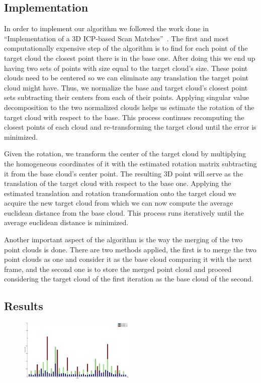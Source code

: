 \subsection{Implementation}
In order to implement our algorithm we followed the work done in ``Implementation of a 3D ICP-based Scan Matches''~\cite{icpImp}. The first and most computationally expensive step of the algorithm is to find for each point of the target cloud the closest point there is in the base one. After doing this we end up having two sets of points with size equal to the target cloud's size. These point clouds need to be centered so we can eliminate any translation the target point cloud might have. Thus, we normalize the base and target cloud's closest point sets subtracting their centers from each of their points. Applying singular value decomposition to the two normalized clouds helps us estimate the rotation of the target cloud with respect to the base. This process continues recomputing the closest points of each cloud and re-transforming the target cloud until the error is minimized.

Given the rotation, we transform the center of the target cloud by multiplying the homogeneous coordinates of it with the estimated rotation matrix subtracting it from the base cloud's center point. The resulting 3D point will serve as the translation of the target cloud with respect to the base one. Applying the estimated translation and rotation transformation onto the target cloud we acquire the new target cloud from which we can now compute the average euclidean distance from the base cloud. This process runs iteratively until the average euclidean distance is minimized.

Another important aspect of the algorithm is the way the merging of the two point clouds is done. There are two methods applied, the first is to merge the two point clouds as one and consider it as the base cloud comparing it with the next frame, and the second one is to store the merged point cloud and proceed considering the target cloud of the first iteration as the base cloud of the second.


\subsection{Results}

\begin{figure}[ht!]
  \centering
    \includegraphics[width=0.49\textwidth]{figures/RMSmergedKD.eps}
    \caption{}
    \label{fig:houseBackground}
\end{figure}


